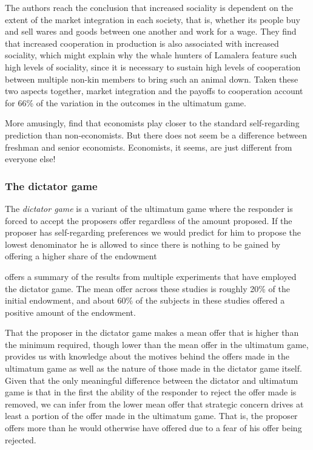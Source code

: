 \documentclass[12pt]{article}
\begin{document}
The authors reach the conclusion that increased sociality is dependent on the extent of the market integration in each society, that is, whether its people buy and sell wares and goods between one another and work for a wage. They find that increased cooperation in production is also associated with increased sociality, which might explain why the whale hunters of Lamalera feature such high levels of sociality, since it is necessary to sustain high levels of cooperation between multiple non-kin members to bring such an animal down. Taken these two aspects together, market integration and the payoffs to cooperation account for 66\% of the variation in the outcomes in the ultimatum game. 

More amusingly, \cite{Carter1991} find that economists play closer to the standard self-regarding prediction than non-economists. But there does not seem be a difference between freshman and senior economists. Economists, it seems, are just different from everyone else!



\subsubsection{The dictator game}

The \textit{dictator game} is a variant of the ultimatum game where the responder is forced to accept the proposers offer regardless of the amount proposed. If the proposer has self-regarding preferences we would predict for him to propose the lowest denominator he is allowed to since there is nothing to be gained by offering a higher share of the endowment

\cite{camerer2011behavioral} offers a summary of the results from multiple experiments that have employed the dictator game. The mean offer across these studies is roughly 20\% of the initial endowment, and about 60\% of the subjects in these studies offered a positive amount of the endowment.

That the proposer in the dictator game makes a mean offer that is higher than the minimum required, though lower than the mean offer in the ultimatum game, provides us with knowledge about the motives behind the offers made in the ultimatum game as well as the nature of those made in the dictator game itself. Given that the only meaningful difference between the dictator and ultimatum game is that in the first the ability of the responder to reject the offer made is removed, we can infer from the lower mean offer that strategic concern drives at least a portion of the offer made in the ultimatum game. That is, the proposer offers more than he would otherwise have offered due to a fear of his offer being rejected.
\end{document}
